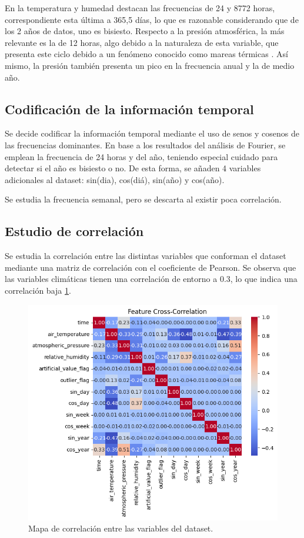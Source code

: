 En la temperatura y humedad destacan las frecuencias de 24 y 8772 horas, correspondiente esta última a 365,5 días, lo que es razonable considerando que de los 
2 años de datos, uno es bisiesto. Respecto a la presión atmosférica, la más relevante es la de 12 horas, algo debido a la naturaleza de esta variable, 
que presenta este ciclo debido a un fenómeno conocido como mareas térmicas \cite{ChapmanLindzen1970}. Así mismo, la presión también presenta un pico en la frecuencia anual y la de medio año.


\subsection{Codificación de la información temporal}
Se decide codificar la información temporal mediante el uso de senos y cosenos de las frecuencias dominantes.
En base a los resultados del análisis de Fourier, se emplean la frecuencia de 24 horas y del año, teniendo especial cuidado para detectar
    si el año es bisiesto o no. De esta forma, se añaden 4 variables adicionales al dataset: sin(dia), cos(diá), sin(año) y cos(año).

Se estudia la frecuencia semanal, pero se descarta al existir poca correlación.

\subsection{Estudio de correlación}
Se estudia la correlación entre las distintas variables que conforman el dataset mediante una matriz de correlación con el coeficiente de Pearson.
Se observa que las variables climáticas tienen una correlación de entorno a 0.3, lo que indica una correlación baja \ref{correlation_map}.

\begin{figure}
    \centering
    \includegraphics[width=.5\linewidth]{images/correlation_heatmap.png}
    \caption{Mapa de correlación entre las variables del dataset.}
    \label{correlation_map}
\end{figure}


